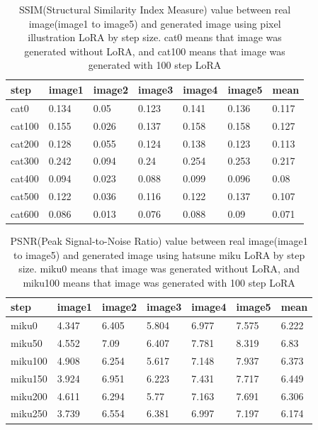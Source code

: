 \documentclass[extendedabs]{bmvc2k}
\begin{document}
\begin{table}[]
\centering
\begin{tabular}{|l|l|l|l|l|l|l|}
\hline
step   & image1 & image2 & image3 & image4 & image5 & mean  \\ \hline
cat0   & 0.134  & 0.05   & 0.123  & 0.141  & 0.136  & 0.117 \\ \hline
cat100 & 0.155  & 0.026  & 0.137  & 0.158  & 0.158  & 0.127 \\ \hline
cat200 & 0.128  & 0.055  & 0.124  & 0.138  & 0.123  & 0.113 \\ \hline
cat300 & 0.242  & 0.094  & 0.24   & 0.254  & 0.253  & 0.217 \\ \hline
cat400 & 0.094  & 0.023  & 0.088  & 0.099  & 0.096  & 0.08  \\ \hline
cat500 & 0.122  & 0.036  & 0.116  & 0.122  & 0.137  & 0.107 \\ \hline
cat600 & 0.086  & 0.013  & 0.076  & 0.088  & 0.09   & 0.071 \\ \hline
\end{tabular}
\caption{SSIM(Structural Similarity Index Measure) value between real image(image1 to image5) and generated image using pixel illustration LoRA by step size. cat0 means that image was generated without LoRA, and cat100 means that image was generated with 100 step LoRA}
\label{tab:pixel-ssim}
\end{table}

\begin{table}[]
\centering
\begin{tabular}{|l|l|l|l|l|l|l|}
\hline
step    & image1 & image2 & image3 & image4 & image5 & mean  \\ \hline
miku0   & 4.347  & 6.405  & 5.804  & 6.977  & 7.575  & 6.222 \\ \hline
miku50  & 4.552  & 7.09   & 6.407  & 7.781  & 8.319  & 6.83  \\ \hline
miku100 & 4.908  & 6.254  & 5.617  & 7.148  & 7.937  & 6.373 \\ \hline
miku150 & 3.924  & 6.951  & 6.223  & 7.431  & 7.717  & 6.449 \\ \hline
miku200 & 4.611  & 6.294  & 5.77   & 7.163  & 7.691  & 6.306 \\ \hline
miku250 & 3.739  & 6.554  & 6.381  & 6.997  & 7.197  & 6.174 \\ \hline

\end{tabular}
\caption{PSNR(Peak Signal-to-Noise Ratio) value between real image(image1 to image5) and generated image using hatsune miku LoRA by step size. miku0 means that image was generated without LoRA, and miku100 means that image was generated with 100 step LoRA}
\label{tab:miku-psnr}
\end{table}
\end{document}
